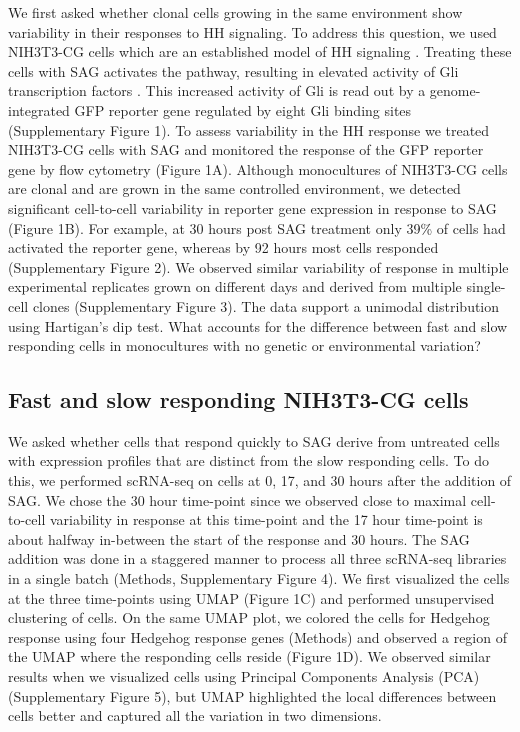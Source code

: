 We first asked whether clonal cells growing in the same environment show variability in their responses to HH signaling. To address this question, we used NIH3T3-CG cells which are an established model of HH signaling \cite{Pusapati2018-gs,Kinnebrew2019-gt}. Treating these cells with SAG activates the pathway, resulting in elevated activity of Gli transcription factors \cite{Briscoe2013-ze,Lee2016-bf,Kong2019-wo}. This increased activity of Gli is read out by a genome-integrated GFP reporter gene regulated by eight Gli binding sites (Supplementary Figure 1). To assess variability in the HH response we treated NIH3T3-CG cells with SAG and monitored the response of the GFP reporter gene by flow cytometry (Figure 1A). Although monocultures of NIH3T3-CG cells are clonal and are grown in the same controlled environment, we detected significant cell-to-cell variability in reporter gene expression in response to SAG (Figure 1B). For example, at 30 hours post SAG treatment only 39\% of cells had activated the reporter gene, whereas by 92 hours most cells responded (Supplementary Figure 2). We observed similar variability of response in multiple experimental replicates grown on different days and derived from multiple single-cell clones (Supplementary Figure 3).  The data support a unimodal distribution using Hartigan’s dip test\cite{Hartigan1985-zq}. What accounts for the difference between fast and slow responding cells in monocultures with no genetic or environmental variation?

\subsection{Fast and slow responding NIH3T3-CG cells}


We asked whether cells that respond quickly to SAG derive from untreated cells with expression profiles that are distinct from the slow responding cells. To do this, we performed scRNA-seq on cells at 0, 17, and 30 hours after the addition of SAG. We chose the 30 hour time-point since we observed close to maximal cell-to-cell variability in response at this time-point and the 17 hour time-point is about halfway in-between the start of the response and 30 hours. The SAG addition was done in a staggered manner to process all three scRNA-seq libraries in a single batch (Methods, Supplementary Figure 4). We first visualized the cells at the three time-points using UMAP (Figure 1C) and performed unsupervised clustering of cells. On the same UMAP plot, we colored the cells for Hedgehog response using four Hedgehog response genes (Methods) and observed a region of the UMAP where the responding cells reside (Figure 1D). We observed similar results when we visualized cells using Principal Components Analysis (PCA) (Supplementary Figure 5), but UMAP highlighted the local differences between cells better and captured all the variation in two dimensions.


